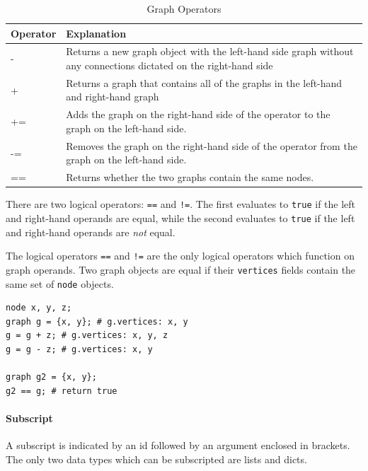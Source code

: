 \documentclass{article}
\newcommand{\code}[1]{\texttt{#1}} %
\begin{document}
\begin{table}[H]
\centering
\begin{tabular}{| p{1.5in} | p{2.75in} |}
\hline
Operator & Explanation \\
\hline
- & Returns a new graph object with the left-hand side graph without any connections dictated on the right-hand side \\
\hline
+ & Returns a graph that contains all of the graphs in the left-hand and right-hand graph \\
\hline
+= & Adds the graph on the right-hand side of the operator to the graph on the left-hand side. \\
\hline
-= & Removes the graph on the right-hand side of the operator from the graph on the left-hand side. \\
\hline
== & Returns whether the two graphs contain the same nodes. \\
\hline
\end{tabular}
\caption{Graph Operators}
\label{tbl:graph-ops}
\end{table}

There are two logical operators: \code{==} and \code{!=}. The first evaluates to \code{true} if the left and right-hand operands are equal, while the second evaluates to \code{true} if the left and right-hand operands are \emph{not} equal.

The logical operators \code{==} and \code{!=} are the only logical operators which function on graph operands. Two graph objects are equal if their \code{vertices} fields contain the same set of \code{node} objects. 


\begin{lstlisting}[language=pltLang, caption=Shows the use of graph operators., label=lst:graph-ops]
node x, y, z;
graph g = {x, y}; # g.vertices: x, y
g = g + z; # g.vertices: x, y, z
g = g - z; # g.vertices: x, y

graph g2 = {x, y};
g2 == g; # return true
\end{lstlisting}


\paragraph{Subscript}

A subscript is indicated by an id followed by an argument enclosed in brackets. The only two data types which can be subscripted are lists and dicts.
\end{document}
